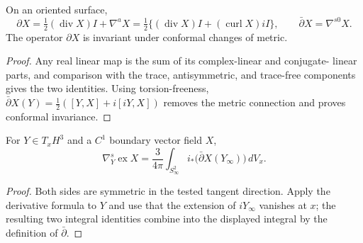 \begin{proposition}
\label{thurston-ch11-complex-derivative}

On an oriented surface,
\[
 \partial X=\tfrac12(\operatorname{div}X)I+\nabla^aX
 =\tfrac12\{(\operatorname{div}X)I+(\operatorname{curl}X)iI\},
 \qquad \bar\partial X=\nabla^{s0}X.
\]
The operator $\partial X$ is invariant under conformal changes of metric.
\end{proposition}
\begin{proof}
\sketch Any real linear map is the sum of its complex-linear and conjugate-
linear parts, and comparison with the trace, antisymmetric, and trace-free
components gives the two identities.  Using torsion-freeness,
$\bar\partial X(Y)=\tfrac12([Y,X]+i[iY,X])$ removes the metric connection and
proves conformal invariance.
\end{proof}

\begin{proposition}
\label{thurston-ch11-extension-symmetric-derivative}

For $Y\in T_xH^3$ and a $C^1$ boundary vector field $X$,
\[
 \nabla^s_Y\operatorname{ex}X
 =\frac{3}{4\pi}\int_{S^2_\infty}i_*\bigl(\bar\partial X(Y_\infty)\bigr)\,dV_x.
\]
\end{proposition}
\begin{proof}
\sketch Both sides are symmetric in the tested tangent direction.  Apply the
derivative formula to $Y$ and use that the extension of $iY_\infty$ vanishes
at $x$; the resulting two integral identities combine into the displayed
integral by the definition of $\bar\partial$.
\end{proof}
